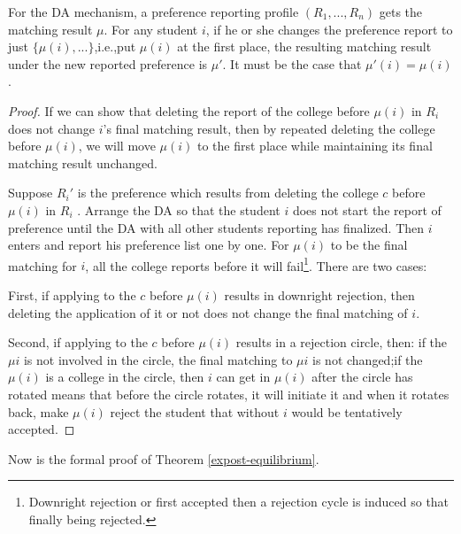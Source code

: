 \begin{lemma}
  \label{yan}
  For the DA mechanism, a preference reporting profile $(R_1,...,R_n)$ gets the matching result $\mu$. For any student $i$, if he or she
  changes the preference report to just $\{\mu(i),...\}$,i.e.,put $\mu(i)$ at the first place, the resulting matching result under the
  new reported preference is $\mu'$. It must be
  the case that  $\mu'(i)=\mu(i)$.
\end{lemma}
\begin{proof}
  If we can show that deleting the report of the college before $\mu(i)$ in $R_i$ does not change $i$'s final matching result, then by repeated deleting the college before $\mu(i)$, we will move $\mu(i)$ to the first place while maintaining its final matching result unchanged.

  Suppose $R_i'$ is the preference which results from deleting the college $c$ before $\mu(i)$ in $R_i$ . Arrange the DA so that the student $i$ does not start the report of preference until the DA with all other students reporting has finalized. Then $i$ enters and report his preference list one by one. For $\mu(i)$ to be the final matching for $i$, all the college reports before it will fail\footnote{Downright rejection or first accepted then a rejection cycle is induced so that finally being rejected.}. There are two cases:
  
  First, if applying to the $c$ before $\mu(i)$ results in downright rejection, then deleting the application of it or not does not change the final matching of $i$.
  
  Second, if applying to  the $c$ before $\mu(i)$ results in a rejection circle, then: if the $\mu{i}$ is not involved in the circle, the final matching to $\mu{i}$ is not changed;if the $\mu(i)$ is a college in the circle, then $i$ can get in $\mu(i)$ after the circle has rotated means that before the circle rotates, it will initiate it and when it rotates back, make $\mu(i)$ reject the student that without $i$ would be tentatively accepted.
\end{proof}

Now is the formal proof of Theorem \ref{expost-equilibrium}.


